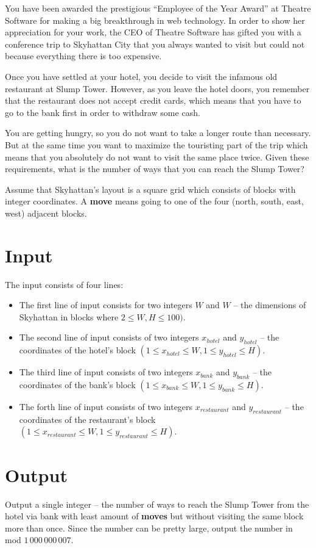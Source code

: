 You have been awarded the prestigious ``Employee of the Year Award'' at Theatre Software for making a big breakthrough in web technology.
In order to show her appreciation for your work, the CEO of Theatre Software has gifted you with a conference trip to Skyhattan City that you always wanted to visit but could not because everything there is too expensive.

Once you have settled at your hotel, you decide to visit the infamous old restaurant at Slump Tower.
However, as you leave the hotel doors, you remember that the restaurant does not accept credit cards, which means that you have to go to the bank first in order to withdraw some cash.

You are getting hungry, so you do not want to take a longer route than necessary.
But at the same time you want to maximize the touristing part of the trip which means that you absolutely do not want to visit the same place twice.
Given these requirements, what is the number of ways that you can reach the Slump Tower?

Assume that Skyhattan's layout is a square grid which consists of blocks with integer coordinates.
A \textbf{move} means going to one of the four (north, south, east, west) adjacent blocks.

\section*{Input}
The input consists of four lines:
\begin{itemize}

\item The first line of input consists for two integers $W$ and $W$ -- the dimensions of Skyhattan in blocks where $2 \leq W, H  \leq 100)$.

\item The second line of input consists of two integers $x_{hotel}$ and $y_{hotel}$ -- the coordinates of the hotel's block $(1 \leq x_{hotel} \leq W, 1 \leq y_{hotel} \leq H)$.

\item The third line of input consists of two integers $x_{bank}$ and $y_{bank}$ -- the coordinates of the bank's block $(1 \leq x_{bank} \leq W, 1 \leq y_{bank} \leq H)$.

\item The forth line of input consists of two integers $x_{restaurant}$ and $y_{restaurant}$ -- the coordinates of the restaurant's block $(1 \leq x_{restaurant} \leq W, 1 \leq y_{restaurant} \leq H)$.

\end{itemize}

\section*{Output}
Output a single integer -- the number of ways to reach the Slump Tower from the hotel via bank with least amount of \textbf{moves} but without visiting the same block more than once. Since the number can be pretty large, output the number in mod $1\,000\,000\,007$.
